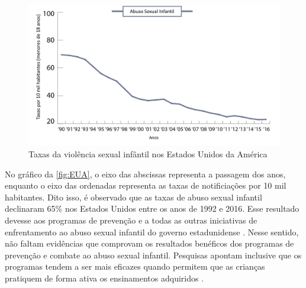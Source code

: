 \begin{figure}[htb]
  \caption{\label{fig:EUA}Taxas da violência sexual infântil nos Estados Unidos da América}
  \vspace{-0.2 cm}
  \begin{center}
    \includegraphics[width=\linewidth]{./Figuras/EUA.pdf}
  \end{center}
  \vspace{-0.8 cm}
\end{figure}

No gráfico da \autoref{fig:EUA}, o eixo das abscissas representa a passagem dos anos, enquanto o eixo das ordenadas representa as taxas de notificiações por 10 mil habitantes. Dito isso, é observado que as taxas de abuso sexual infantil declinaram 65\% nos Estados Unidos entre os anos de 1992 e 2016. Esse resultado devesse aos programas de prevenção e a todas as outras iniciativas de enfrentamento ao abuso sexual infantil do governo estadunidense \cite{mendelson2015parent}. Nesse sentido, não faltam evidências que comprovam os resultados benéficos dos programas de prevenção e combate ao abuso sexual infantil. Pesquisas apontam inclusive que os programas tendem a ser mais eficazes quando  permitem que as crianças pratiquem de forma ativa os ensinamentos adquiridos \cite{collin2013lessons}.



